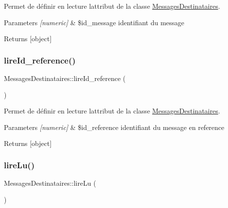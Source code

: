 Permet de définir en lecture l\textquotesingle{}attribut de la classe \hyperlink{class_messages_destinataires}{Messages\+Destinataires}. 


\begin{DoxyParams}{Parameters}
{\em \mbox{[}numeric\mbox{]}} & \$id\+\_\+message identifiant du message \\
\hline
\end{DoxyParams}
\begin{DoxyReturn}{Returns}
\mbox{[}object\mbox{]} 
\end{DoxyReturn}
\mbox{\label{class_messages_destinataires_a023cadca1a1a12c6e0f3e4b7e5d0db08}} 
\subsubsection{\texorpdfstring{lire\+Id\+\_\+reference()}{lireId\_reference()}}
{\footnotesize\ttfamily Messages\+Destinataires\+::lire\+Id\+\_\+reference (\begin{DoxyParamCaption}{ }\end{DoxyParamCaption})}



Permet de définir en lecture l\textquotesingle{}attribut de la classe \hyperlink{class_messages_destinataires}{Messages\+Destinataires}. 


\begin{DoxyParams}{Parameters}
{\em \mbox{[}numeric\mbox{]}} & \$id\+\_\+reference identifiant du message en reference \\
\hline
\end{DoxyParams}
\begin{DoxyReturn}{Returns}
\mbox{[}object\mbox{]} 
\end{DoxyReturn}
\mbox{\label{class_messages_destinataires_a87c02935ce0ce0568b5f2260feb3862b}} 
\subsubsection{\texorpdfstring{lire\+Lu()}{lireLu()}}
{\footnotesize\ttfamily Messages\+Destinataires\+::lire\+Lu (\begin{DoxyParamCaption}{ }\end{DoxyParamCaption})}



